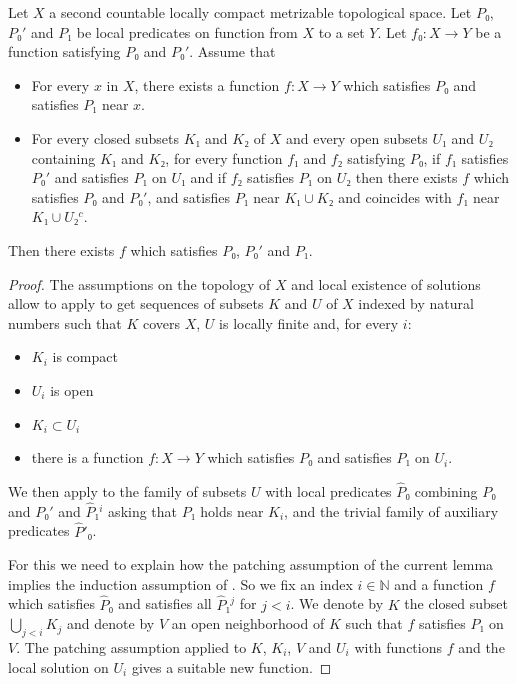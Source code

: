\documentclass[10pt,a4paper]{article}
\newcommand{\co}{\!:}
\newcommand{\uses}[1]{}
\newcommand{\lean}[1]{}
\newcommand{\leanok}{}
\begin{document}
\begin{lemma}
  \label{lem:inductive_construction_of_loc}\lean{inductive_construction_of_loc}\leanok
  Let $X$ a second countable locally compact metrizable topological space. Let $P₀$, $P₀'$
  and $P₁$ be local predicates on function from $X$ to a set $Y$.
  Let $f₀ \co X → Y$ be a function satisfying $P₀$ and $P₀'$. Assume that
  \begin{itemize}
    \item
      For every $x$ in $X$, there exists a function $f \co X → Y$ which
      satisfies $P₀$ and satisfies $P₁$ near $x$.
    \item
      For every closed subsets $K₁$ and $K₂$ of $X$ and every open subsets $U₁$ and $U₂$
      containing $K₁$ and $K₂$, for every function $f₁$ and $f₂$ satisfying $P₀$,
      if $f₁$ satisfies $P₀'$ and satisfies $P₁$ on $U₁$ and if $f₂$ satisfies $P₁$ on $U₂$
      then there exists $f$ which satisfies $P₀$ and $P₀'$, and satisfies $P₁$ near
      $K₁ ∪ K₂$ and coincides with $f₁$ near $K₁ ∪ U₂^c$.
  \end{itemize}
  Then there exists $f$ which satisfies $P₀$, $P₀'$ and $P₁$.
\end{lemma}

\begin{proof}
  \leanok\uses{lem:inductive_construction,lem:exists_locally_finite_subcover_of_locally,def:restrict_germ_predicate}
  The assumptions on the topology of $X$ and local existence of solutions
  allow to apply  to get sequences
  of subsets $K$ and $U$ of $X$ indexed by natural numbers such that $K$ covers
  $X$, $U$ is locally finite and, for every $i$:
  \begin{itemize}
    \item $K_i$ is compact
    \item $U_i$ is open
    \item $K_i ⊂ U_i$
    \item there is a function $f \co X → Y$ which satisfies $P₀$ and satisfies $P₁$ on $U_i$.
  \end{itemize}

  We then apply  to the family of subsets $U$
  with local predicates $\hat{P}₀$ combining $P₀$ and $P₀'$ and $\hat{P}₁^i$ asking that
  $P₁$ holds near $K_i$, and the trivial family of auxiliary predicates $\hat{P}'₀$.

  For this we need to explain how the patching assumption of the current lemma
  implies the induction assumption of . So we fix
  an index $i ∈ ℕ$ and a function $f$ which satisfies $\hat{P}₀$ and satisfies all
  $\hat{P}₁^j$ for $j < i$. We denote by $K$ the closed subset
  $\bigcup_{j < i} K_j$ and denote by $V$ an open neighborhood of $K$ such that
  $f$ satisfies $P₁$ on $V$. The patching assumption applied to $K$, $K_i$, $V$
  and $U_i$ with functions $f$ and the local solution on $U_i$ gives a suitable
  new function.
\end{proof}
\end{document}
